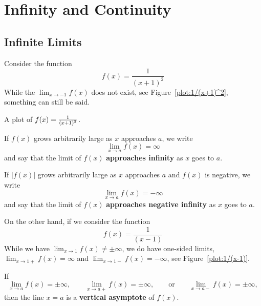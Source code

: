 \chapter{Infinity and Continuity}


\section{Infinite Limits}


Consider the function
\[
f(x) = \frac{1}{(x+1)^2}
\]
While the $\lim_{x\to -1} f(x)$ does not exist, see
Figure~\ref{plot:1/(x+1)^2}, something can still be said.
\begin{marginfigure}
\caption{A plot of $f(x)=\protect\frac{1}{(x+1)^2}$.}
\label{plot:1/(x+1)^2}
\end{marginfigure}


\begin{definition}\label{def:inflimit}
If $f(x)$ grows arbitrarily large as $x$ approaches $a$, we write
\[
\lim_{x\to a} f(x) = \infty
\]
and say that the limit of $f(x)$ \textbf{approaches infinity} as $x$
goes to $a$.

If $|f(x)|$ grows arbitrarily large as $x$ approaches $a$ and $f(x)$ is
negative, we write
\[
\lim_{x\to a} f(x) = -\infty
\]
and say that the limit of $f(x)$ \textbf{approaches negative infinity}
as $x$ goes to $a$.
\end{definition}

On the other hand, if we consider the function 
\[
f(x) = \frac{1}{(x-1)}
\]
While we have $\lim_{x\to 1} f(x) \ne \pm\infty$, we do have one-sided
limits, $\lim_{x\to 1+} f(x) = \infty$ and $\lim_{x\to 1-} f(x) =
-\infty$, see Figure~\ref{plot:1/(x-1)}.


\begin{definition}\label{def:vert asymptote}
If 
\[
\lim_{x\to a} f(x) = \pm\infty, \qquad \lim_{x\to a+} f(x) = \pm\infty, \qquad\text{or}\qquad \lim_{x\to a-} f(x) = \pm\infty,
\]
then the line $x=a$ is a \textbf{vertical asymptote} of $f(x)$.
\end{definition}


